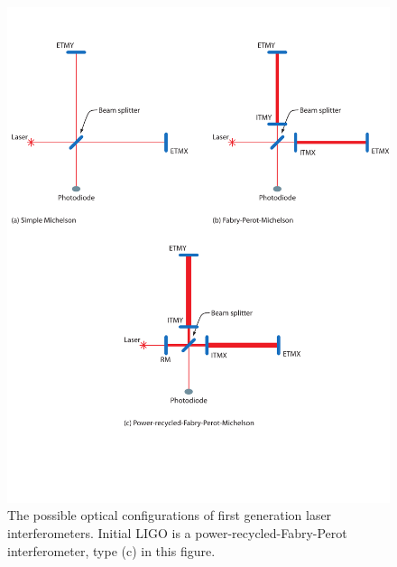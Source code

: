 \begin{figure}[p]
\begin{center}
\includegraphics[width=\linewidth]{figures/inspiral/ifoconfigs}
\end{center}
\caption[Optical Configuration of LIGO]{%
\label{f:ifodesign}
The possible optical configurations of first generation laser interferometers.
Initial LIGO is a power-recycled-Fabry-Perot interferometer, type (c) in this
figure.
}
\end{figure}

